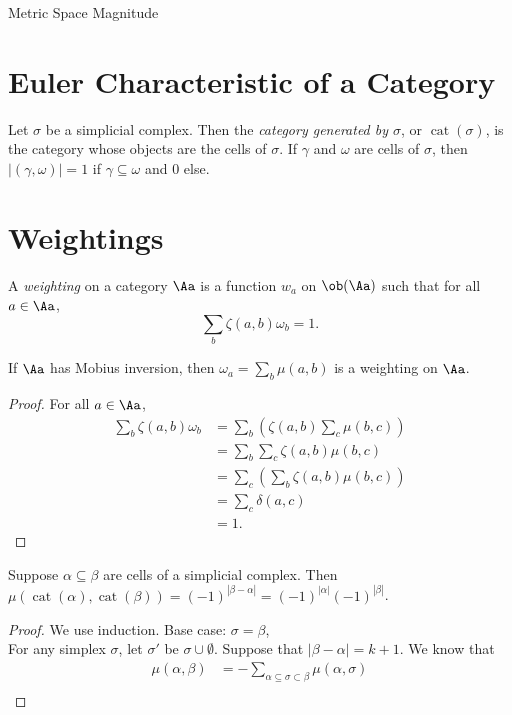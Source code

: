 \documentclass[12pt]{pom_thesis}
\DeclareMathOperator{\cat}{cat}
\begin{document}
\begin{chapter}{Metric Space Magnitude}
\begin{defn}
\end{defn}
\section{Euler Characteristic of a Category}
\begin{defn}
Let $\sigma$ be a simplicial complex. Then the \emph{category generated by $\sigma$}, or $\cat(\sigma)$, is the category whose objects are the cells of $\sigma$. If $\gamma$ and $\omega$ are cells of $\sigma$, then $|(\gamma, \omega)| = 1$ if $\gamma \subseteq \omega$ and 0 else.
\end{defn}
\section{Weightings}
\begin{defn}
A \emph{weighting} on a category $\Aa$ is a function $w_a$ on $\ob(\Aa)$ such that for all $a \in \Aa$,
\[
\sum_b \zeta(a,b)\omega_b = 1.
\]
\end{defn}
\begin{lemma}
\label{mobius_is_weighting}
If $\Aa$ has Mobius inversion, then $\omega_a = \sum_b \mu(a,b)$ is a weighting on $\Aa$.
\end{lemma}
\begin{proof} For all $a \in \Aa$,
\begin{align*}
\sum_b \zeta(a,b)\omega_b &= \sum_b\left( \zeta(a,b)\sum_c \mu(b,c)\right)\\
&=\sum_b\sum_c\zeta(a,b)\mu(b,c)\\
&=\sum_c\left(\sum_b\zeta(a,b)\mu(b,c)\right)\\
&=\sum_c \delta(a,c)\\
&=1.
\end{align*}
\end{proof}
\begin{lemma}
\label{mu_lemma}
Suppose $\alpha \subseteq \beta$ are cells of a simplicial complex. Then $\mu(\cat(\alpha), \cat(\beta)) =(-1)^{|\beta - \alpha|} = (-1)^{|\alpha|} (-1)^{|\beta|}$.
\end{lemma}
\begin{proof}
We use induction. Base case: $\sigma = \beta$, \checkmark \\
For any simplex $\sigma$, let $\sigma'$ be $\sigma \cup \emptyset$. Suppose that $|\beta - \alpha| = k+1$. We know that \begin{align*}
\mu(\alpha, \beta) &=  - \sum_{\alpha \subseteq \sigma \subset \beta} \mu(\alpha, \sigma)\\

\end{align*}
\end{proof}
\end{chapter}
\end{document}
